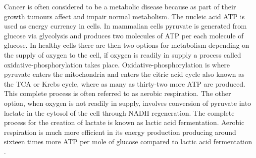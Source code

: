 Cancer is often considered to be a metabolic disease because as part of their growth tumours affect and impair normal metabolism. The nucleic acid \ac{ATP} is used as energy currency in cells. In mammalian cells pyruvate is generated from glucose via glycolysis and produces two molecules of \ac{ATP} per each molecule of glucose. In healthy cells there are then two options for metabolism depending on the supply of oxygen to the cell, if oxygen is readily in supply a process called oxidative-phosphorylation takes place. Oxidative-phosphorylation is where pyruvate enters the mitochondria and enters the citric acid cycle also known as the \ac{TCA} or Krebs cycle, where as many as thirty-two more \ac{ATP} are produced. This complete process is often referred to as aerobic respiration. The other option, when oxygen is not readily in supply, involves conversion of pyruvate into lactate in the cytosol of the cell through NADH regeneration. The complete process for the creation of lactate is known as lactic acid fermentation. Aerobic respiration is much more efficient in its energy production producing  around sixteen times more \ac{ATP} per mole of glucose compared to lactic acid fermentation \cite{Romero-Garcia2011TumorView}. 


